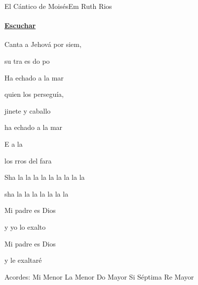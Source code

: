 \documentclass[12pt, spanish]{book}
\begin{document}
    \begin{song}{El Cántico de Moisés}{Em}
    {} %
    {Ruth Rios}
    {} %
    {} %
        \ifChordBk
        \paragraph{\mbox{}\hfill\protect\href{https://open.spotify.com/intl-es/track/1dSyyG3Q85sW8gpJuQdDT8}{Escuchar}\mbox{}\hfill}
        \fi


        \begin{SBOpGroup}
            Canta a Jehová por siem,

            su tra es do po
        \end{SBOpGroup}

        \begin{SBOpGroup}
            Ha echado a la mar~

            quien los perseguía,~

            jinete y caballo~

            ha echado a la mar~
        \end{SBOpGroup}

        \begin{SBChorus}
            E a la 

            los rros del fara~

            Sha la la la la la la la la la

            sha la la la la la la la
        \end{SBChorus}

        \begin{SBOpGroup}
            Mi padre es Dios~

            y yo lo exalto~

            Mi padre es Dios~

            y le exaltaré~
        \end{SBOpGroup}

        \ifChordBk
        \begin{SBOpGroup}
            Acordes:
            \upchord{\Em}\qquad Mi Menor \hfill
            \upchord{\Am}\qquad La Menor \hfill\null\break
            \upchord{\C}\qquad Do Mayor \hfill
            \upchord{\Bseven}\qquad Si S\'eptima \hfill\null\break
            \upchord{\D}\qquad Re Mayor \hfill
        \end{SBOpGroup}
        \fi
    \end{song}
\end{document}
